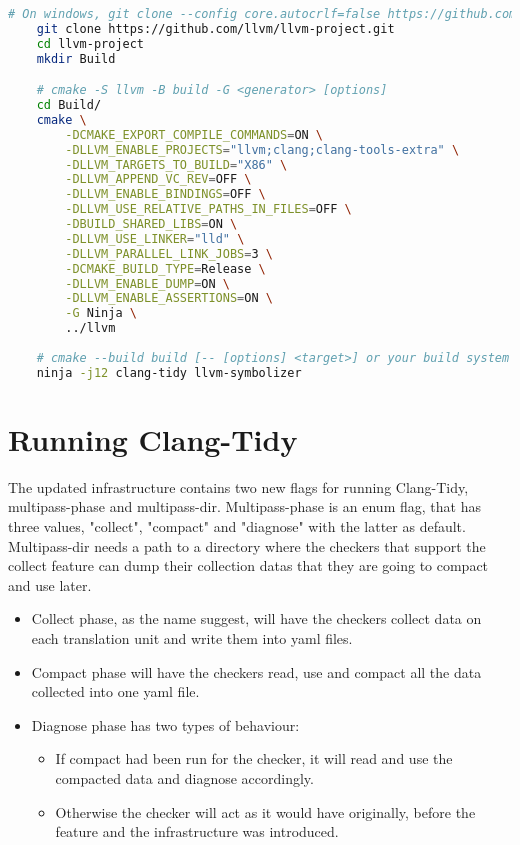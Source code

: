 \begin{lstlisting}[language={bash}]
	# On windows, git clone --config core.autocrlf=false https://github.com/llvm/llvm-project.git
	git clone https://github.com/llvm/llvm-project.git
	cd llvm-project
	mkdir Build

	# cmake -S llvm -B build -G <generator> [options]
	cd Build/
	cmake \
		-DCMAKE_EXPORT_COMPILE_COMMANDS=ON \
		-DLLVM_ENABLE_PROJECTS="llvm;clang;clang-tools-extra" \
		-DLLVM_TARGETS_TO_BUILD="X86" \
		-DLLVM_APPEND_VC_REV=OFF \
		-DLLVM_ENABLE_BINDINGS=OFF \
		-DLLVM_USE_RELATIVE_PATHS_IN_FILES=OFF \
		-DBUILD_SHARED_LIBS=ON \
		-DLLVM_USE_LINKER="lld" \
		-DLLVM_PARALLEL_LINK_JOBS=3 \
		-DCMAKE_BUILD_TYPE=Release \
		-DLLVM_ENABLE_DUMP=ON \
		-DLLVM_ENABLE_ASSERTIONS=ON \
		-G Ninja \
		../llvm
	
	# cmake --build build [-- [options] <target>] or your build system specified above directly.
	ninja -j12 clang-tidy llvm-symbolizer
\end{lstlisting}

\section{Running Clang-Tidy}

The updated infrastructure contains two new flags for running Clang-Tidy, multipass-phase and multipass-dir.
Multipass-phase is an enum flag, that has three values, "collect", "compact" and "diagnose" with the latter as default.
Multipass-dir needs a path to a directory where the checkers that support the collect feature can dump their collection datas
that they are going to compact and use later.
\begin{itemize}
	\item Collect phase, as the name suggest, will have the checkers collect data on each translation unit and write them into yaml files.
	\item Compact phase will have the checkers read, use and compact all the data collected into one yaml file.
	\item Diagnose phase has two types of behaviour:
	\begin{itemize}
		\item If compact had been run for the checker, it will read and use the compacted data and diagnose accordingly.
		\item Otherwise the checker will act as it would have originally, before the feature and the infrastructure was introduced.
	\end{itemize}
\end{itemize}


